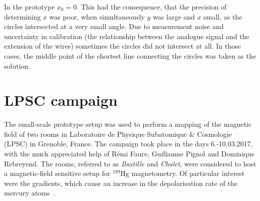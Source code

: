 In the prototype $x_0 = 0$. This had the consequence, that the precision of determining $x$ was poor, when simultaneously $y$ was large and $x$ small, as the circles intersected at a very small angle. Due to measurement noise and uncertainty in calibration (the relationship between the analogue signal and the extension of the wires) sometimes the circles did not intersect at all. In those cases, the middle point of the shortest line connecting the circles was taken as the solution.










\section{LPSC campaign}
\label{sec:lpsc_campaign}
The small-scale prototype setup was used to perform a mapping of the magnetic field of two rooms in Laboratoire de Physique Subatomique \& Cosmologie (LPSC) in Grenoble, France. The campaign took place in the days 6.-10.03.2017, with the much appreciated help of Rémi Faure, Guillaume Pignol and Dominique Rebreyend. The rooms, referred to as \emph{Bastille} and \emph{Chalet}, were considered to host a magnetic-field sensitive setup for ${}^{199}$Hg magnetometry. Of particular interest were the gradients, which cause an increase in the depolarisation rate of the mercury atoms~\cite{FertlThesis}.

